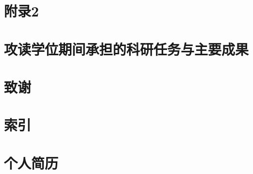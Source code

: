\documentclass[doctor]{fnuthesis}
\begin{document}
\chapter{附录2}

\printbibliography[heading=bibnumbered]

\chapter{攻读学位期间承担的科研任务与主要成果}

\chapter{致谢}

\chapter{索引}

\chapter{个人简历}
\end{document}
